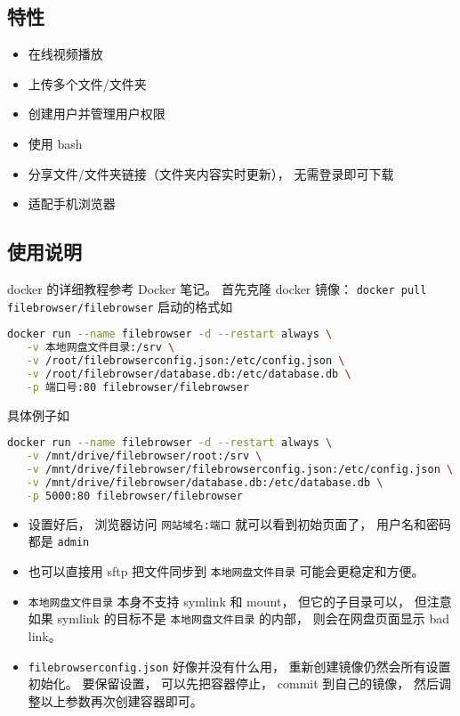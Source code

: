
\begin{issues}
\issueDraft
\end{issues}

\subsection{特性}
\begin{itemize}
\item 在线视频播放
\item 上传多个文件/文件夹
\item 创建用户并管理用户权限
\item 使用 bash
\item 分享文件/文件夹链接（文件夹内容实时更新）， 无需登录即可下载
\item 适配手机浏览器
\end{itemize}

\subsection{使用说明}
docker 的详细教程参考 Docker 笔记。 首先克隆 docker 镜像： \verb|docker pull filebrowser/filebrowser|
启动的格式如
\begin{lstlisting}[language=bash]
docker run --name filebrowser -d --restart always \
   -v 本地网盘文件目录:/srv \
   -v /root/filebrowserconfig.json:/etc/config.json \
   -v /root/filebrowser/database.db:/etc/database.db \
   -p 端口号:80 filebrowser/filebrowser
\end{lstlisting}
具体例子如 %
\begin{lstlisting}[language=bash]
docker run --name filebrowser -d --restart always \
   -v /mnt/drive/filebrowser/root:/srv \
   -v /mnt/drive/filebrowser/filebrowserconfig.json:/etc/config.json \
   -v /mnt/drive/filebrowser/database.db:/etc/database.db \
   -p 5000:80 filebrowser/filebrowser
\end{lstlisting}

\begin{itemize}
\item 设置好后， 浏览器访问 \verb`网站域名:端口` 就可以看到初始页面了， 用户名和密码都是 \verb`admin`
\item 也可以直接用 sftp 把文件同步到 \verb`本地网盘文件目录` 可能会更稳定和方便。
\item \verb`本地网盘文件目录` 本身不支持 symlink 和 mount， 但它的子目录可以， 但注意如果 symlink 的目标不是 \verb|本地网盘文件目录| 的内部， 则会在网盘页面显示 bad link。
\item \verb|filebrowserconfig.json| 好像并没有什么用， 重新创建镜像仍然会所有设置初始化。 要保留设置， 可以先把容器停止， commit 到自己的镜像， 然后调整以上参数再次创建容器即可。
\end{itemize}

